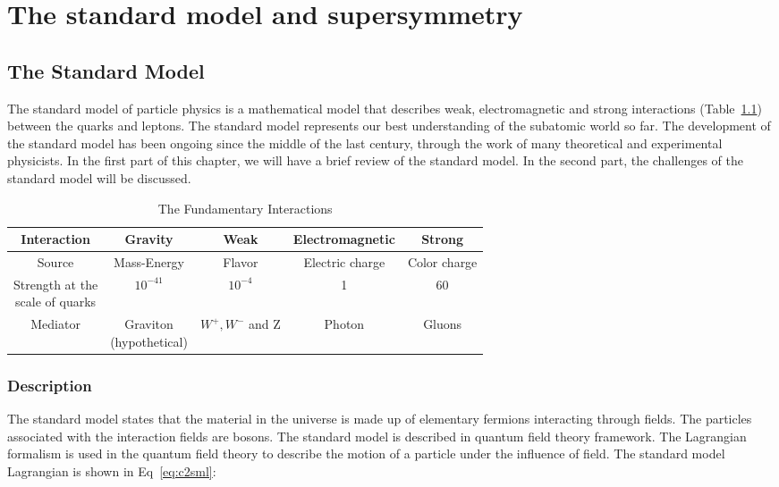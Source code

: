 \chapter{The standard model and supersymmetry}
\clearpage
\section{The Standard Model}
The standard model of particle physics is a mathematical model that describes weak, electromagnetic and strong interactions (Table~\ref{tab:c24ei}) between the quarks and leptons. The standard model represents our best understanding of the subatomic world so far. The development of the standard model has been ongoing since the middle of the last century, through the work of many theoretical and experimental physicists. In the first part of this chapter, we will have a brief review of the standard model. In the second part, the challenges of the standard model will be discussed. 

\begin{table}[htbp]
\fontsize{10 pt}{1.2 em}
\selectfont
\begin{centering}
\caption{\label{tab:c24ei} The Fundamentary Interactions}
\hspace*{-4ex}
\begin{tabular}{|c|c|c|c|c|}
\hline
Interaction                                      & Gravity & Weak & Electromagnetic & Strong \\
\hline
Source                                           & Mass-Energy & Flavor & Electric charge & Color charge \\
\hline
\specialcell{Strength at the \\ scale of quarks} & $10^{-41}$ & $10^{-4}$ & 1 & 60 \\
\hline
Mediator                                         & \specialcell{Graviton\\(hypothetical)} & $W^{+},W^{-}$ and Z & Photon & Gluons \\
\hline
\end{tabular}
\par\end{centering}
\end{table}

\clearpage
\subsection{Description}

The standard model states that the material in the universe is made up of elementary fermions interacting through fields. The particles associated with the interaction fields are bosons. The standard model is described in quantum field theory framework. The Lagrangian formalism is used in the quantum field theory to describe the motion of a particle under the influence of field. The standard model Lagrangian is shown in Eq~\ref{eq:c2sml}: 

